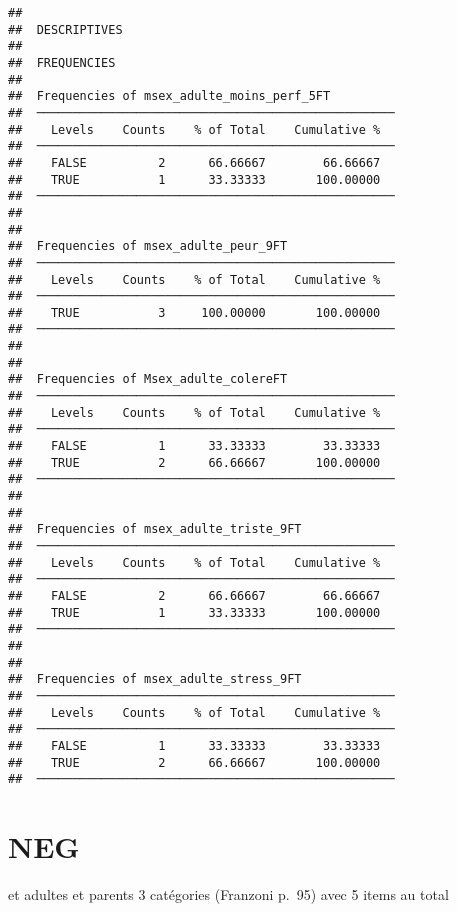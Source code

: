 \documentclass[
]{article}
\begin{document}
\begin{verbatim}
## 
##  DESCRIPTIVES
## 
##  FREQUENCIES
## 
##  Frequencies of msex_adulte_moins_perf_5FT          
##  ────────────────────────────────────────────────── 
##    Levels    Counts    % of Total    Cumulative %   
##  ────────────────────────────────────────────────── 
##    FALSE          2      66.66667        66.66667   
##    TRUE           1      33.33333       100.00000   
##  ────────────────────────────────────────────────── 
## 
## 
##  Frequencies of msex_adulte_peur_9FT                
##  ────────────────────────────────────────────────── 
##    Levels    Counts    % of Total    Cumulative %   
##  ────────────────────────────────────────────────── 
##    TRUE           3     100.00000       100.00000   
##  ────────────────────────────────────────────────── 
## 
## 
##  Frequencies of Msex_adulte_colereFT                
##  ────────────────────────────────────────────────── 
##    Levels    Counts    % of Total    Cumulative %   
##  ────────────────────────────────────────────────── 
##    FALSE          1      33.33333        33.33333   
##    TRUE           2      66.66667       100.00000   
##  ────────────────────────────────────────────────── 
## 
## 
##  Frequencies of msex_adulte_triste_9FT              
##  ────────────────────────────────────────────────── 
##    Levels    Counts    % of Total    Cumulative %   
##  ────────────────────────────────────────────────── 
##    FALSE          2      66.66667        66.66667   
##    TRUE           1      33.33333       100.00000   
##  ────────────────────────────────────────────────── 
## 
## 
##  Frequencies of msex_adulte_stress_9FT              
##  ────────────────────────────────────────────────── 
##    Levels    Counts    % of Total    Cumulative %   
##  ────────────────────────────────────────────────── 
##    FALSE          1      33.33333        33.33333   
##    TRUE           2      66.66667       100.00000   
##  ──────────────────────────────────────────────────
\end{verbatim}

\hypertarget{neg}{%
\section{NEG}\label{neg}}

et adultes et parents 3 catégories (Franzoni p.~95) avec 5 items au
total
\end{document}
